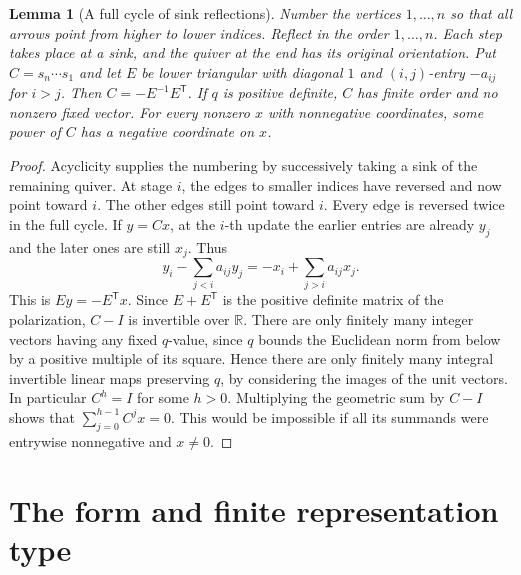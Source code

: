 \documentclass[11pt,oneside,openany]{book}
\newtheorem{lemma}[theorem]{Lemma}
\theoremstyle{definition}
\theoremstyle{remark}
\begin{document}
\begin{lemma}[A full cycle of sink reflections]
\label{res:QU04}
Number the vertices \(1,\ldots,n\) so that all arrows point from
higher to lower indices. Reflect in the order \(1,\ldots,n\).
Each step takes place at a sink, and the quiver at the end has
its original orientation. Put \(C=s_n\cdots s_1\) and let \(E\)
be lower triangular with diagonal \(1\) and \((i,j)\)-entry
\(-a_{ij}\) for \(i>j\). Then \(C=-E^{-1}E^{\mathsf T}\).
If \(q\) is positive definite, \(C\) has finite order and no
nonzero fixed vector. For every nonzero \(x\) with nonnegative
coordinates, some power of \(C\) has a negative coordinate on \(x\).
\end{lemma}
\begin{proof}
Acyclicity supplies the numbering by successively taking a sink
of the remaining quiver. At stage \(i\), the edges to smaller
indices have reversed and now point toward \(i\). The other
edges still point toward \(i\). Every edge is reversed twice in
the full cycle. If \(y=Cx\), at the \(i\)-th update the earlier
entries are already \(y_j\) and the later ones are still \(x_j\).
Thus
\[
  y_i-\sum_{j<i}a_{ij}y_j=-x_i+\sum_{j>i}a_{ij}x_j .
\]
This is \(Ey=-E^{\mathsf T}x\). Since \(E+E^{\mathsf T}\) is
the positive definite matrix of the polarization, \(C-I\)
is invertible over \(\mathbb R\). There are only finitely many
integer vectors having any fixed \(q\)-value, since \(q\) bounds
the Euclidean norm from below by a positive multiple of its
square. Hence there are only finitely many integral invertible
linear maps preserving \(q\), by considering the images of the
unit vectors. In particular \(C^h=I\) for some \(h>0\).
Multiplying the geometric sum by \(C-I\) shows that
\(\sum_{j=0}^{h-1}C^j x=0\). This would be impossible if all its
summands were entrywise nonnegative and \(x\ne 0\).
\end{proof}

\section{The form and finite representation type}
\end{document}
